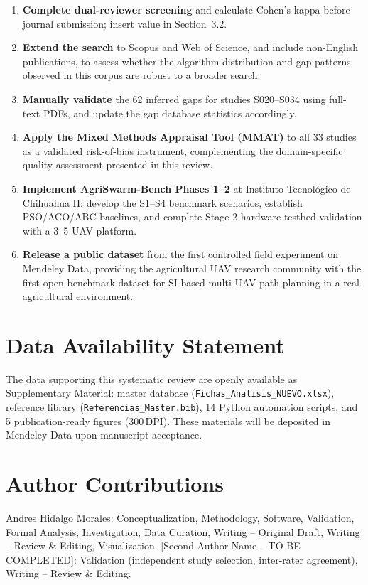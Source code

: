 \documentclass[review,3p,times]{elsarticle}
\begin{document}
\begin{enumerate}
  \item \textbf{Complete dual-reviewer screening} and calculate Cohen's kappa before journal submission; insert value in Section~3.2.
  \item \textbf{Extend the search} to Scopus and Web of Science, and include non-English publications, to assess whether the algorithm distribution and gap patterns observed in this corpus are robust to a broader search.
  \item \textbf{Manually validate} the 62 inferred gaps for studies S020--S034 using full-text PDFs, and update the gap database statistics accordingly.
  \item \textbf{Apply the Mixed Methods Appraisal Tool (MMAT)} to all 33 studies as a validated risk-of-bias instrument, complementing the domain-specific quality assessment presented in this review.
  \item \textbf{Implement AgriSwarm-Bench Phases 1--2} at Instituto Tecnológico de Chihuahua II: develop the S1--S4 benchmark scenarios, establish PSO/ACO/ABC baselines, and complete Stage 2 hardware testbed validation with a 3--5 UAV platform.
  \item \textbf{Release a public dataset} from the first controlled field experiment on Mendeley Data, providing the agricultural UAV research community with the first open benchmark dataset for SI-based multi-UAV path planning in a real agricultural environment.
\end{enumerate}



\section*{Data Availability Statement}
The data supporting this systematic review are openly available as Supplementary Material: master database (\texttt{Fichas\_Analisis\_NUEVO.xlsx}), reference library (\texttt{Referencias\_Master.bib}), 14 Python automation scripts, and 5 publication-ready figures (300\,DPI). These materials will be deposited in Mendeley Data upon manuscript acceptance.

\section*{Author Contributions}
Andres Hidalgo Morales: Conceptualization, Methodology, Software, Validation, Formal Analysis, Investigation, Data Curation, Writing -- Original Draft, Writing -- Review \& Editing, Visualization.
[Second Author Name -- TO BE COMPLETED]: Validation (independent study selection, inter-rater agreement), Writing -- Review \& Editing.
\end{document}

